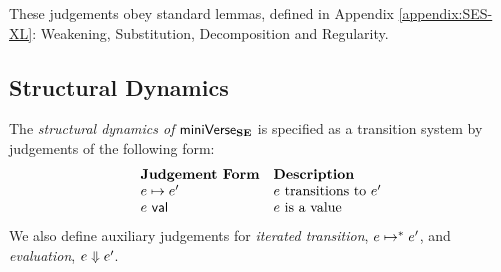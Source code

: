 

These judgements obey standard lemmas, defined in Appendix \ref{appendix:SES-XL}: Weakening, Substitution, Decomposition and Regularity.

\subsection{Structural Dynamics}\label{sec:dynamics-U}
The \emph{structural dynamics of }$\mathsf{miniVerse}_\textbf{SE}$ is specified as a transition system by judgements of the following form:
\[\begin{array}{ll}
\textbf{Judgement Form} & \textbf{Description}\\
e \mapsto e' & \text{$e$ transitions to $e'$}\\
e~\mathsf{val} & \text{$e$ is a value}
\end{array}\]
We also define auxiliary judgements for \emph{iterated transition}, $e \mapsto^{*} e'$, and \emph{evaluation}, $e \Downarrow e'$.

